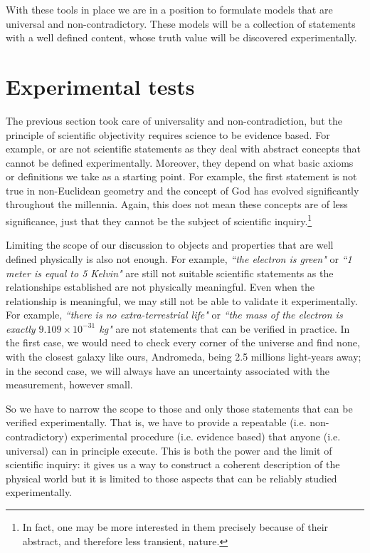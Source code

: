 \documentclass[11pt,letterpaper,fleqn]{memoir} %
\begin{document}
With these tools in place we are in a position to formulate models that are universal and non-contradictory. These models will be a collection of statements with a well defined content, whose truth value will be discovered experimentally.

\section{Experimental tests}

The previous section took care of universality and non-contradiction, but the principle of scientific objectivity requires science to be evidence based. For example,  or  are not scientific statements as they deal with abstract concepts that cannot be defined experimentally. Moreover, they depend on what basic axioms or definitions we take as a starting point. For example, the first statement is not true in non-Euclidean geometry and the concept of God has evolved significantly throughout the millennia. Again, this does not mean these concepts are of less significance, just that they cannot be the subject of scientific inquiry.\footnote{In fact, one may be more interested in them precisely because of their abstract, and therefore less transient, nature.}

Limiting the scope of our discussion to objects and properties that are well defined physically is also not enough. For example, \emph{``the electron is green"} or \emph{``1 meter is equal to 5 Kelvin"} are still not suitable scientific statements as the relationships established are not physically meaningful. Even when the relationship is meaningful, we may still not be able to validate it experimentally. For example, \emph{``there is no extra-terrestrial life"} or \emph{``the mass of the electron is exactly $9.109 \times 10^{-31}$ kg"} are not statements that can be verified in practice. In the first case, we would need to check every corner of the universe and find none, with the closest galaxy like ours, Andromeda, being 2.5 millions light-years away; in the second case, we will always have an uncertainty associated with the measurement, however small.

So we have to narrow the scope to those and only those statements that can be verified experimentally. That is, we have to provide a repeatable (i.e. non-contradictory) experimental procedure (i.e. evidence based) that anyone (i.e. universal) can in principle execute. This is both the power and the limit of scientific inquiry: it gives us a way to construct a coherent description of the physical world but it is limited to those aspects that can be reliably studied experimentally.
\end{document}

